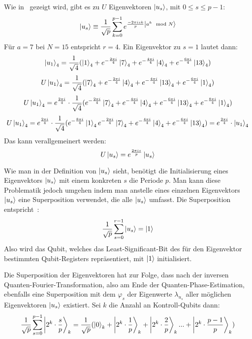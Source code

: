 Wie in~\autocite[227]{nielsen_chuang_2010} gezeigt wird, gibt es zu \(U\) Eigenvektoren \(\ket{u_s}\), 
mit \(0 \leq s \leq p-1\): 
\[\ket{u_s} \equiv
\frac{1}{\sqrt{p}}
\sum_{k=0}^{p-1} e^{\frac{-2 \pi i s k}{p}\ket{a^k \mod N}} %
\]
Für \(a=7\) bei \(N=15\) entspricht \(r=4\).
Ein Eigenvektor zu \(s=1\) lautet dann:
\[
    \ket{u_1}_4 =
    \frac{1}{\sqrt{4}}(
        \ket{1}_4 + 
        e^{-\frac{2 \pi i}{4}}\ket{7}_4 + 
        e^{-\frac{4 \pi i}{4}}\ket{4}_4+ 
        e^{-\frac{6 \pi i}{4}}\ket{13}_4
    )
    \]
\[
    U\ket{u_1}_4 =
    \frac{1}{\sqrt{4}}(
        \ket{7}_4 + 
        e^{-\frac{2 \pi i}{4}}\ket{4}_4 + 
        e^{-\frac{4 \pi i}{4}}\ket{13}_4+ 
        e^{-\frac{6 \pi i}{4}}\ket{1}_4
    )
    \]
\[
    U\ket{u_1}_4 =
    e^{\frac{2 \pi i}{4}}
    \cdot
    \frac{1}{\sqrt{4}}(
        e^{-\frac{2 \pi i}{4}}\ket{7}_4 + 
        e^{-\frac{4 \pi i}{4}}\ket{4}_4 + 
        e^{-\frac{6 \pi i}{4}}\ket{13}_4+ 
        e^{-\frac{8 \pi i}{4}}\ket{1}_4
    )
    \]
\[
    U\ket{u_1}_4 =
    e^{\frac{2 \pi i}{4}}
    \cdot
    \frac{1}{\sqrt{4}}(
        e^{-\frac{8 \pi i}{4}}\ket{1}_4
        e^{-\frac{2 \pi i}{4}}\ket{7}_4 + 
        e^{-\frac{4 \pi i}{4}}\ket{4}_4 + 
        e^{-\frac{6 \pi i}{4}}\ket{13}_4 )
    =
    e^{\frac{2 \pi i}{4}} \cdot
    \ket{u_1}_4
    \]
Das kann verallgemeinert werden:
\[U\ket{u_s} = e^{\frac{2 \pi i s}{p}}\ket{u_s}\]

Wie man in der Definition von \(\ket{u_s}\) %
sieht, 
benötigt die Initialisierung eines Eigenvektors \(\ket{u_s}\) mit einem konkreten \(s\) die Periode \(p\).
Man kann diese Problematik jedoch umgehen indem man anstelle eines einzelnen Eigenvektors \(\ket{u_s}\)
eine Superposition verwendet, die alle \(\ket{u_s}\) umfasst.
Die Superposition entspricht~\autocite[227]{nielsen_chuang_2010}:
\[\frac{1}{\sqrt{p}} \sum_{s=0}^{r-1}\ket{u_s} = \ket{1}\] 
Also wird das Qubit, welches das Least-Significant-Bit des für den Eigenvektor bestimmten Qubit-Registers repräsentiert, 
mit \(\ket{1}\) initialisiert.

Die Superposition der Eigenvektoren hat zur Folge, 
dass nach der inversen Quanten-Fourier-Transformation, also am Ende der Quanten-Phase-Estimation,
ebenfalls eine Superposition mit dem \(\varphi_s\) der Eigenwerte \(\lambda_{u_s}\) aller möglichen Eigenvektoren \(\ket{u_s}\) existiert.
Sei \(k\) die Anzahl an Kontroll-Qubits dann:
\[
    \frac{1}{\sqrt{p}} \sum_{s=0}^{p-1}\ket{2^k \cdot \frac{s}{p}}_k   = 
    \frac{1}{\sqrt{p}} (\ket{0}_k  + \ket{2^k \cdot \frac{1}{p}}_k + \ket{2^k \cdot \frac{2}{p}}_k  ... + \ket{2^k \cdot \frac{p-1}{p}}_k )
    \]


